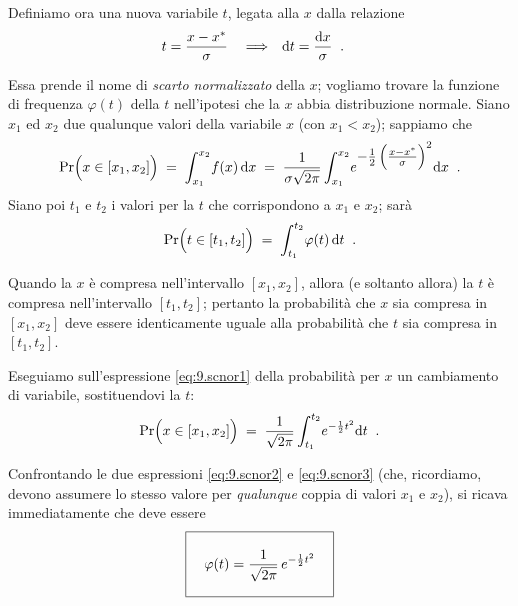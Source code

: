 Definiamo ora una nuova variabile $t$, legata alla $x$ dalla
relazione
\begin{align*}
  t &= \frac{x - x^*}{ \sigma }
  & &\Longrightarrow
  & \mathrm{d} t &= \frac{\mathrm{d} x}{\sigma} \;\; .
\end{align*}

Essa prende il nome di \emph{scarto normalizzato} della $x$;
vogliamo trovare la funzione di frequenza $\varphi(t)$ della
$t$ nell'ipotesi che la $x$ abbia distribuzione normale.
Siano $x_1$ ed $x_2$ due qualunque valori della variabile
$x$ (con $ x_1 < x_2$); sappiamo che
\begin{equation} \label{eq:9.scnor1}
  \Pr \Bigl( x \in \left[ x_1 , x_2 \right] \Bigr)
  \; = \; \int_{x_1}^{x_2} \! f(x) \, \mathrm{d} x \; = \;
  \frac{1}{\sigma \sqrt{2\pi}} \int_{x_1}^{x_2} \!
  e^{\textstyle -\frac{1}{2} \left( \frac{x -
  x^*}{\sigma} \right) ^2 } \mathrm{d} x \;\; .
\end{equation}
Siano poi $t_1$ e $t_2$ i valori per la $t$ che
corrispondono a $x_1$ e $x_2$; sar\`a
\begin{equation} \label{eq:9.scnor2}
  \Pr \Bigl( t \in \left[ t_1 , t_2 \right] \Bigr)
  \; = \; \int_{t_1}^{t_2} \! \varphi(t) \, \mathrm{d} t \;\; .
\end{equation}

Quando la $x$ \`e compresa nell'intervallo $ \left[ x_1 ,
  x_2 \right] $, allora (e soltanto allora) la $t$ \`e
compresa nell'intervallo $ \left[ t_1 , t_2 \right]$;
pertanto la probabilit\`a che $x$ sia compresa in $ \left[
  x_1 , x_2 \right] $ deve essere identicamente uguale alla
probabilit\`a che $t$ sia compresa in $ \left[ t_1 , t_2
\right] $.

Eseguiamo sull'espressione \eqref{eq:9.scnor1} della
probabilit\`a per $x$ un cambiamento di variabile,
sostituendovi la $t$:
\begin{equation} \label{eq:9.scnor3}
  \Pr \Bigl( x \in \left[ x_1 , x_2 \right]
  \Bigr) \; = \; \frac{1}{\sqrt{2\pi}}
  \int_{t_1}^{t_2} \! e^{- \frac{1}{2}
    t^2} \mathrm{d} t \;\; .
\end{equation}

Confrontando le due espressioni \eqref{eq:9.scnor2} e
\eqref{eq:9.scnor3} (che, ricordiamo, devono assumere lo
stesso valore per \emph{qualunque} coppia di valori $x_1$ e
$x_2$), si ricava immediatamente che deve essere
\begin{equation} \label{eq:9.pscnor}
  \boxed{ \rule[-6mm]{0mm}{14mm} \quad
    \varphi(t) = \frac{1}{\sqrt{2\pi}} \,
    e^{- \frac{1}{2} t^2} \quad }
\end{equation}

